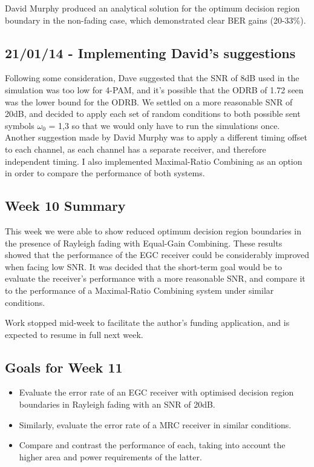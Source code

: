 David Murphy produced an analytical solution for the optimum decision region
boundary in the non-fading case, which demonstrated clear BER gains
(20-33\%).

\subsection{21/01/14 - Implementing David's suggestions}

Following some consideration, Dave suggested that the SNR of 8dB used in
the simulation was too low for 4-PAM, and it's possible that the ODRB of
1.72 seen was the lower bound for the ODRB. We settled on a more
reasonable SNR of 20dB, and decided to apply each set of random
conditions to both possible sent symbols $\omega_0$ = 1,3 so that we would
only have to run the simulations once. Another suggestion made by David Murphy
was to apply a different timing offset to each channel, as each channel
has a separate receiver, and therefore independent timing. I also
implemented Maximal-Ratio Combining as an option in order to compare the
performance of both systems.

\subsection{Week 10 Summary}

This week we were able to show reduced optimum decision region
boundaries in the presence of Rayleigh fading with Equal-Gain Combining.
These results showed that the performance of the EGC receiver could be
considerably improved when facing low SNR. It was decided that the
short-term goal would be to evaluate the receiver's performance with a
more reasonable SNR, and compare it to the performance of a
Maximal-Ratio Combining system under similar conditions.

Work stopped mid-week to facilitate the author's funding application,
and is expected to resume in full next week.

\subsection{Goals for Week 11}

\begin{itemize}
\itemsep1pt\parskip0pt
\item
  Evaluate the error rate of an EGC receiver with optimised decision
  region boundaries in Rayleigh fading with an SNR of 20dB.
\item
  Similarly, evaluate the error rate of a MRC receiver in similar
  conditions.
\item
  Compare and contrast the performance of each, taking into account the
  higher area and power requirements of the latter.
\end{itemize}

